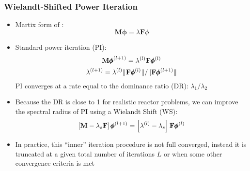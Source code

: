 \begin{frame}
	\frametitle{ Wielandt-Shifted Power Iteration}
	\begin{itemize}
	    \item Martix form of :
	    \begin{equation}
	        \mathbf{M\phi}=\lambda\mathbf{F}\phi
	    \end{equation}
	    \vspace{-1.5em}
		\item Standard power iteration (PI):
				\begin{gather}
					\mathbf{M} {\pmb{\phi}}^{(l+1)} = \lambda^{(l)} \mathbf{F}  \pmb{\phi}^{(l)}  \\
					\lambda^{(l+1)} = \lambda^{(l)} \| \mathbf{F} \pmb{\phi}^{(l)}\|/\| \mathbf{F} \pmb{\phi}^{(l+1)}\|
				\end{gather}
		PI converges at a rate equal to the dominance ratio (DR): $\lambda_1/\lambda_2$
		\vspace{-0.3em}
		\item Because the DR is close to 1 for realistic reactor problems, we can improve the spectral radius of PI using a Wielandt Shift (WS):
			\begin{equation}
				\left[ \mathbf{M} - \lambda_s\mathbf{F} \right] \pmb{\phi}^{(l+1)} = \left[ \lambda^{(l)} - \lambda_s \right] \mathbf{F}  \pmb{\phi}^{(l)} \label{eqn:WS}
			\end{equation}
		\item In practice, this ``inner'' iteration procedure is not full converged, instead it is truncated at a given total number of iterations $L$ or when some other convergence criteria is met
	\end{itemize}
\end{frame}

